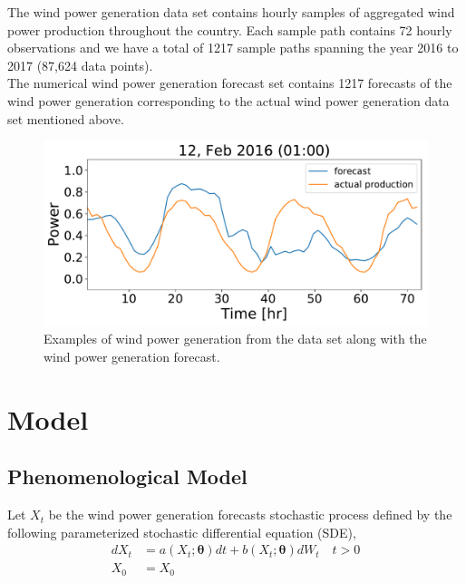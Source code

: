 \documentclass[ima, 20pt, portrait, plainboxedsections]{sciposter}
\begin{document}
\begin{multicols}{3}
The wind power generation data set contains hourly samples of aggregated wind power production throughout the country. Each sample path contains 72 hourly observations and we have a total of 1217 sample paths spanning the year 2016 to 2017 (87,624 data points). \\

The numerical wind power generation forecast set contains  1217 forecasts of the wind power generation  corresponding to the actual  wind power generation data set mentioned above.

\begin{figure}[t]
\begin{center}
    \includegraphics[width=0.8\linewidth]{Forecast_data_82.pdf}
\end{center}
   \caption{Examples of wind power generation from the data set along with the wind power generation forecast.}
\label{fig:long}
\label{fig:onecol}
\end{figure}

\section*{Model}

\subsection*{Phenomenological  Model}

Let $X_t$ be the  wind power generation forecasts stochastic process defined by the  following parameterized stochastic differential equation (SDE),
\begin{equation}
\begin{split}
dX_t &= a(X_t; \bm{\theta}) dt + b (X_t; \bm{\theta} ) dW_t \quad t > 0 \\
X_0 & = X_0
\end{split}
\label{main}
\end{equation}


\end{multicols}
\end{document}
